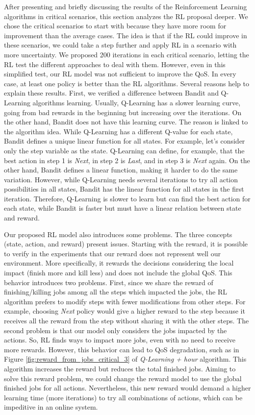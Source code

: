 After presenting and briefly discussing the results of the Reinforcement Learning algorithms in critical scenarios, this section analyzes the RL proposal deeper. We chose the critical scenarios to start with because they have more room for improvement than the average cases. The idea is that if the RL could improve in these scenarios, we could take a step further and apply RL in a scenario with more uncertainty. We proposed 200 iterations in each critical scenario, letting the RL test the different approaches to deal with them. However, even in this simplified test, our RL model was not sufficient to improve the QoS. In every case, at least one policy is better than the RL algorithms. Several reasons help to explain these results. First, we verified a difference between Bandit and Q-Learning algorithms learning. Usually, Q-Learning has a slower learning curve, going from bad rewards in the beginning but increasing over the iterations. On the other hand, Bandit does not have this learning curve. The reason is linked to the algorithm idea. While Q-Learning has a different Q-value for each state, Bandit defines a unique linear function for all states. For example, let's consider only the step variable as the state. Q-Learning can define, for example, that the best action in step 1 is \emph{Next}, in step 2 is \emph{Last}, and in step 3 is \emph{Next} again. On the other hand, Bandit defines a linear function, making it harder to do the same variation. However, while Q-Learning needs several iterations to try all action possibilities in all states, Bandit has the linear function for all states in the first iteration. Therefore, Q-Learning is slower to learn but can find the best action for each state, while Bandit is faster but must have a linear relation between state and reward. 

Our proposed RL model also introduces some problems. The three concepts (state, action, and reward) present issues. Starting with the reward, it is possible to verify in the experiments that our reward does not represent well our environment. More specifically, it rewards the decisions considering the local impact (finish more and kill less) and does not include the global QoS. This behavior introduces two problems. First, since we share the reward of finishing/killing jobs among all the steps which impacted the jobs, the RL algorithm prefers to modify steps with fewer modifications from other steps. For example, choosing \emph{Next} policy would give a higher reward to the step because it receives all the reward from the step without sharing it with the other steps. The second problem is that our model only considers the jobs impacted by the actions. So, RL finds ways to impact more jobs, even with no need to receive more rewards. However, this behavior can lead to QoS degradation, such as in Figure \ref{fig:reward_from_jobs_critical_3} of \emph{Q-Learning + hour} algorithm. This algorithm increases the reward but reduces the total finished jobs. Aiming to solve this reward problem, we could change the reward model to use the global finished jobs for all actions. Nevertheless, this new reward would demand a higher learning time (more iterations) to try all combinations of actions, which can be impeditive in an online system.

